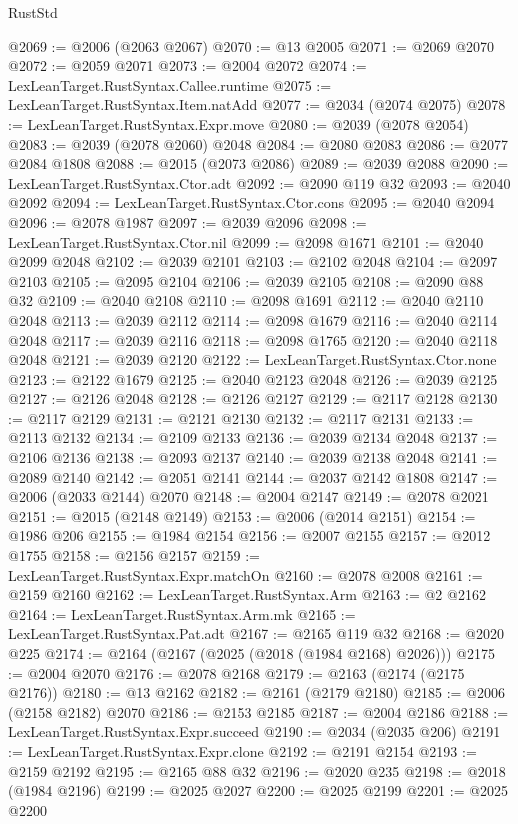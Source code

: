 \begin{lexlean}{RustStd}
\begin{coremodule}
@2069 := @2006 (@2063 @2067)
@2070 := @13 @2005
@2071 := @2069 @2070
@2072 := @2059 @2071
@2073 := @2004 @2072
@2074 := LexLeanTarget.RustSyntax.Callee.runtime
@2075 := LexLeanTarget.RustSyntax.Item.natAdd
@2077 := @2034 (@2074 @2075)
@2078 := LexLeanTarget.RustSyntax.Expr.move
@2080 := @2039 (@2078 @2054)
@2083 := @2039 (@2078 @2060) @2048
@2084 := @2080 @2083
@2086 := @2077 @2084 @1808
@2088 := @2015 (@2073 @2086)
@2089 := @2039 @2088
@2090 := LexLeanTarget.RustSyntax.Ctor.adt
@2092 := @2090 @119 @32
@2093 := @2040 @2092
@2094 := LexLeanTarget.RustSyntax.Ctor.cons
@2095 := @2040 @2094
@2096 := @2078 @1987
@2097 := @2039 @2096
@2098 := LexLeanTarget.RustSyntax.Ctor.nil
@2099 := @2098 @1671
@2101 := @2040 @2099 @2048
@2102 := @2039 @2101
@2103 := @2102 @2048
@2104 := @2097 @2103
@2105 := @2095 @2104
@2106 := @2039 @2105
@2108 := @2090 @88 @32
@2109 := @2040 @2108
@2110 := @2098 @1691
@2112 := @2040 @2110 @2048
@2113 := @2039 @2112
@2114 := @2098 @1679
@2116 := @2040 @2114 @2048
@2117 := @2039 @2116
@2118 := @2098 @1765
@2120 := @2040 @2118 @2048
@2121 := @2039 @2120
@2122 := LexLeanTarget.RustSyntax.Ctor.none
@2123 := @2122 @1679
@2125 := @2040 @2123 @2048
@2126 := @2039 @2125
@2127 := @2126 @2048
@2128 := @2126 @2127
@2129 := @2117 @2128
@2130 := @2117 @2129
@2131 := @2121 @2130
@2132 := @2117 @2131
@2133 := @2113 @2132
@2134 := @2109 @2133
@2136 := @2039 @2134 @2048
@2137 := @2106 @2136
@2138 := @2093 @2137
@2140 := @2039 @2138 @2048
@2141 := @2089 @2140
@2142 := @2051 @2141
@2144 := @2037 @2142 @1808
@2147 := @2006 (@2033 @2144) @2070
@2148 := @2004 @2147
@2149 := @2078 @2021
@2151 := @2015 (@2148 @2149)
@2153 := @2006 (@2014 @2151)
@2154 := @1986 @206
@2155 := @1984 @2154
@2156 := @2007 @2155
@2157 := @2012 @1755
@2158 := @2156 @2157
@2159 := LexLeanTarget.RustSyntax.Expr.matchOn
@2160 := @2078 @2008
@2161 := @2159 @2160
@2162 := LexLeanTarget.RustSyntax.Arm
@2163 := @2 @2162
@2164 := LexLeanTarget.RustSyntax.Arm.mk
@2165 := LexLeanTarget.RustSyntax.Pat.adt
@2167 := @2165 @119 @32
@2168 := @2020 @225
@2174 := @2164 (@2167 (@2025 (@2018 (@1984 @2168) @2026)))
@2175 := @2004 @2070
@2176 := @2078 @2168
@2179 := @2163 (@2174 (@2175 @2176))
@2180 := @13 @2162
@2182 := @2161 (@2179 @2180)
@2185 := @2006 (@2158 @2182) @2070
@2186 := @2153 @2185
@2187 := @2004 @2186
@2188 := LexLeanTarget.RustSyntax.Expr.succeed
@2190 := @2034 (@2035 @206)
@2191 := LexLeanTarget.RustSyntax.Expr.clone
@2192 := @2191 @2154
@2193 := @2159 @2192
@2195 := @2165 @88 @32
@2196 := @2020 @235
@2198 := @2018 (@1984 @2196)
@2199 := @2025 @2027
@2200 := @2025 @2199
@2201 := @2025 @2200

\end{coremodule}
\end{lexlean}
